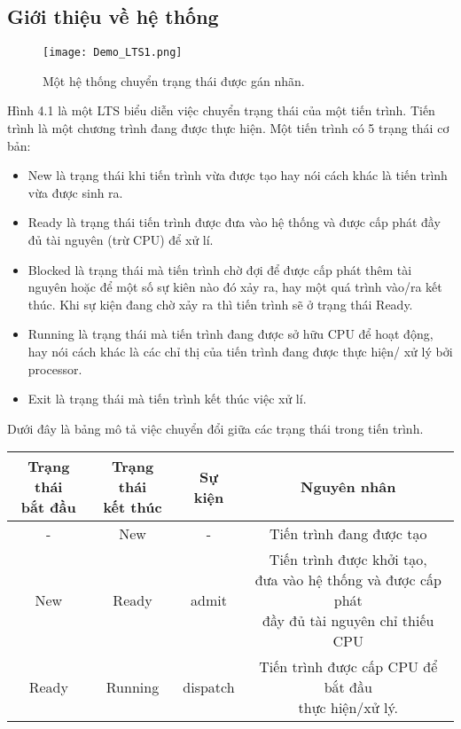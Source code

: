\documentclass[a4paper,13pt,oneside,openany]{book}
\begin{document}
\begin{flushleft}
	\section{Giới thiệu về hệ thống}
		\begin{figure}[h]
			\centering
			\texttt{[image: Demo\_LTS1.png]}
			\caption{Một hệ thống chuyển trạng thái được gán nhãn.}
			\label{fig:Demo_LTS1}
		\end{figure}
		\noindent
	Hình 4.1 là một LTS biểu diễn việc chuyển trạng thái của một tiến trình. Tiến trình là một chương trình đang được thực hiện. Một tiến trình có 5 trạng thái cơ bản:
	\begin{itemize}
		\item New là trạng thái khi tiến trình vừa được tạo hay nói cách khác là tiến trình vừa được sinh ra.
		\item Ready là trạng thái tiến trình được đưa vào hệ thống và được cấp phát đầy đủ tài nguyên (trừ CPU) để xử lí.
		\item Blocked là trạng thái mà tiến trình chờ đợi để được cấp phát thêm tài nguyên hoặc để một số sự kiên nào đó xảy ra, hay một quá trình vào/ra kết thúc. Khi sự kiện đang chờ xảy ra thì tiến trình sẽ ở trạng thái Ready.
		\item Running là trạng thái mà tiến trình đang được sở hữu CPU để hoạt động, hay nói cách khác là các chỉ thị của tiến trình đang được thực hiện/ xử lý bởi processor. 
		\item Exit là trạng thái mà tiến trình kết thúc việc xử lí.
	\end{itemize}
	Dưới đây là bảng mô tả việc chuyển đổi giữa các trạng thái trong tiến trình.
	\begin{table}[!ht]
		\centering
		\renewcommand{\arraystretch}{1.25}
		\begin{tabular}{|c|c|c|c|}
			\hline
			 \shortstack{Trạng thái\\bắt đầu} & \shortstack{Trạng thái\\kết thúc} & Sự kiện & Nguyên nhân \\
			\hline
			- & New & - & Tiến trình đang được tạo \\
			\hline
			New & Ready & admit & \shortstack{Tiến trình được khởi tạo,\\đưa vào hệ thống và được cấp phát\\đầy đủ tài nguyên chỉ thiếu CPU}\\
			\hline
			Ready & Running & dispatch & \shortstack{Tiến trình được cấp CPU để bắt đầu\\thực hiện/xử lý. }\\

\end{tabular}
\end{table}
\end{flushleft}
\end{document}
